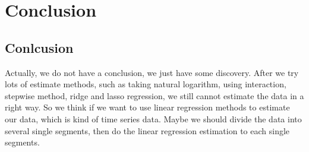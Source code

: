 
\chapter{Conclusion} %

\label{Chapter5} %

\section{Conlcusion}
Actually, we do not have a conclusion, we just have some discovery. After we try lots of estimate methods, such as taking natural logarithm, using interaction, stepwise method, ridge and lasso regression, we still cannot estimate the data in a right way. So we think if we want to use linear regression methods to estimate our data, which is kind of time series data. Maybe we should divide the data into several single segments, then do the linear regression estimation to each single segments.
